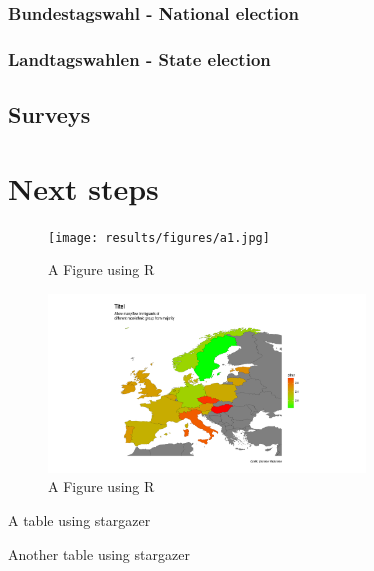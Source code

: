 \documentclass[14pt, a4paper]{article}
\begin{document}
\subsubsection{Bundestagswahl - National election}

\subsubsection{Landtagswahlen - State election}


\subsection{Surveys}

\section{Next steps}







\begin{figure}
\caption{A Figure using R}
\centering
\texttt{[image: results/figures/a1.jpg]}
\end{figure}

\begin{figure}
	\caption{A Figure using R}
	\centering
	\includegraphics[width=0.75\textwidth]{results/figures/a3.pdf}
\end{figure}

\begin{table}
\begin{scriptsize}
%
\end{scriptsize}
\caption{A table using stargazer}
\end{table}

\begin{table}
\begin{scriptsize}
%
\end{scriptsize}
\caption{Another table using stargazer}
\end{table}

\newpage

\printbibliography
\end{document}

